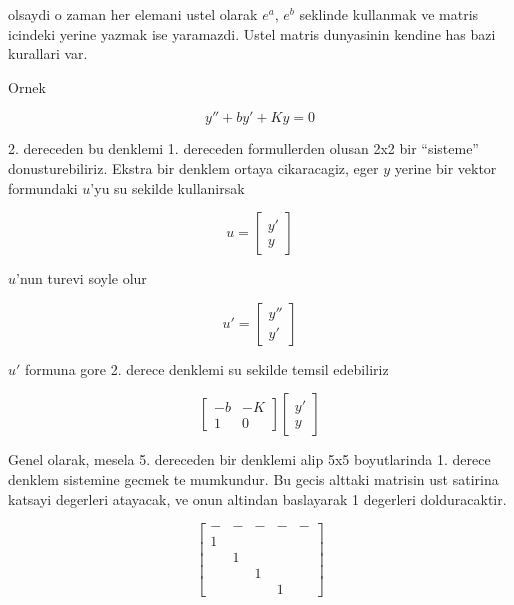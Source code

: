 \documentclass[12pt,fleqn]{article}\usepackage{../common}
\begin{document}
olsaydi o zaman her elemani ustel olarak $e^{a}$, $e^b$ seklinde kullanmak
ve matris icindeki yerine yazmak ise yaramazdi. Ustel matris dunyasinin
kendine has bazi kurallari var.

Ornek

\[ y'' + by' + Ky = 0 \]

2. dereceden bu denklemi 1. dereceden formullerden olusan 2x2 bir
``sisteme'' donusturebiliriz. Ekstra bir denklem ortaya cikaracagiz, eger
$y$ yerine bir vektor formundaki $u$'yu su sekilde kullanirsak

\[ u = 
\left[\begin{array}{c}
y' \\ y
\end{array}\right]
 \]

$u$'nun turevi soyle olur

\[ 
u' = 
\left[\begin{array}{c}
y'' \\ y'
\end{array}\right]
 \]

$u'$ formuna gore 2. derece denklemi su sekilde temsil edebiliriz

\[ 
\left[\begin{array}{cc}
-b & -K \\
1 & 0
\end{array}\right]
\left[\begin{array}{c}
y' \\ y
\end{array}\right]
 \]

Genel olarak, mesela 5. dereceden bir denklemi alip 5x5 boyutlarinda 1. 
derece denklem sistemine gecmek te mumkundur. Bu gecis alttaki matrisin 
ust satirina katsayi degerleri atayacak, ve onun altindan baslayarak 1 
degerleri dolduracaktir. 

\[ 
\left[\begin{array}{rrrrr}
- & - & - & - & - \\
1 &&&& \\
& 1 &&& \\
&& 1 && \\
&&& 1 & 
\end{array}\right]
 \]
\end{document}

